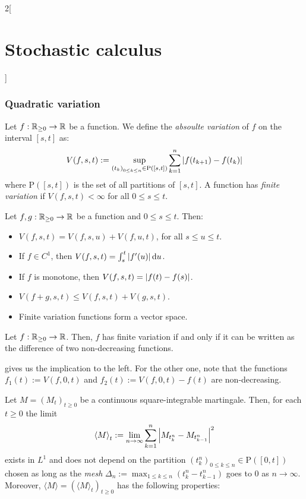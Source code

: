 \documentclass[../../../main_math.tex]{subfiles}
\begin{document}
\begin{multicols}{2}[\section{Stochastic calculus}]
  \subsubsection{Quadratic variation}
  \begin{definition}
    Let $f:\mathbb{R}_{\geq 0}\to\mathbb{R}$ be a function. We define the \emph{absoulte variation} of $f$ on the interval $[s,t]$ as:
    $$
      V(f,s,t):=\sup_{{(t_k)}_{0\leq k\leq n}\in \mathrm{P}([s,t])}\sum_{k=1}^{n}\abs{f(t_{k+1})-f(t_k)}
    $$
    where $\mathrm{P}([s,t])$ is the set of all partitions of $[s,t]$. A function has \emph{finite variation} if $V(f,s,t)<\infty$ for all $0\leq s\leq t$.
  \end{definition}
  \begin{lemma}\label{SC:properties_variation}
    Let $f,g:\mathbb{R}_{\geq 0}\to\mathbb{R}$ be a function and $0\leq s\leq t$. Then:
    \begin{itemize}
      \item $V(f,s,t)=V(f,s,u)+V(f,u,t)$, for all $s\leq u\leq t$.
      \item If $f\in C^1$, then $V(f,s,t)=\int_s^t\abs{f'(u)}\dd{u}$.
      \item If $f$ is monotone, then $V(f,s,t)=\abs{f(t)-f(s)}$.
      \item $\displaystyle V(f+g,s,t)\leq V(f,s,t)+V(g,s,t)$.
      \item Finite variation functions form a vector space.
    \end{itemize}
  \end{lemma}
  \begin{proposition}\label{SC:difference_of_increasing}
    Let $f:\mathbb{R}_{\geq 0}\to\mathbb{R}$. Then, $f$ has finite variation if and only if it can be written as the difference of two non-decreasing functions.
  \end{proposition}
  \begin{sproof}
     gives us the implication to the left. For the other one, note that the functions $f_1(t):=V(f,0,t)$ and $f_2(t):=V(f,0,t)-f(t)$ are non-decreasing.
  \end{sproof}
  \begin{theorem}
    Let $M={(M_t)}_{t\geq 0}$ be a continuous square-integrable martingale. Then, for each $t\geq 0$ the limit
    $$
      {\langle M\rangle}_t:=\lim_{n\to\infty}\sum_{k=1}^{n}\abs{M_{t_k^n}-M_{t_{k-1}^n}}^2
    $$
    exists in $L^1$ and does not depend on the partition ${(t_k^n)}_{0\leq k\leq n}\in \mathrm{P}([0,t])$ chosen as long as the \emph{mesh} $\Delta_n:= \max_{1\leq k\leq n}(t_k^n-t_{k-1}^n)$ goes to $0$ as $n\to\infty$. Moreover, $\langle M\rangle=({\langle M\rangle}_t)_{t\geq 0}$ has the following properties:

\end{theorem}
\end{multicols}
\end{document}
